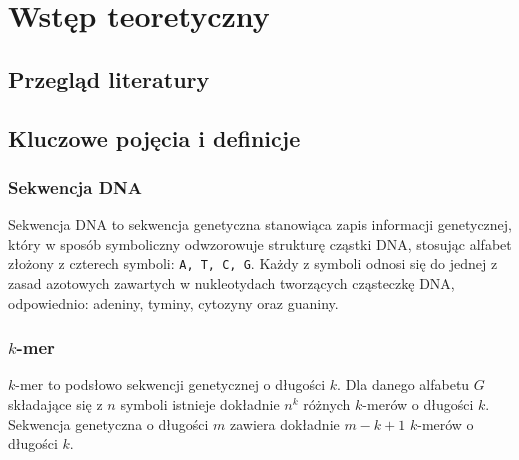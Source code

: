 \clearpage
\section{Wstęp teoretyczny}

    \subsection{Przegląd literatury}


    \subsection{Kluczowe pojęcia i definicje}

        \subsubsection{Sekwencja DNA}

            Sekwencja DNA to sekwencja genetyczna stanowiąca zapis informacji genetycznej, który w sposób symboliczny odwzorowuje strukturę cząstki DNA, stosując alfabet złożony z czterech symboli: \texttt{A, T, C, G}. Każdy z symboli odnosi się do jednej z zasad azotowych zawartych w nukleotydach tworzących cząsteczkę DNA, odpowiednio: adeniny, tyminy, cytozyny oraz guaniny.

        \subsubsection{$k$-mer}

            $k$-mer to podsłowo sekwencji genetycznej o długości $k$. Dla danego alfabetu $G$ składające się z $n$ symboli istnieje dokładnie $n^k$ różnych $k$-merów o długości $k$. Sekwencja genetyczna o długości $m$ zawiera dokładnie $m - k + 1$ $k$-merów o długości $k$.


